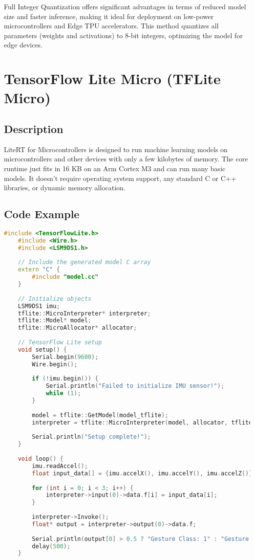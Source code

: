 Full Integer Quantization offers significant advantages in terms of reduced model size and faster inference, making it ideal for deployment on low-power microcontrollers and Edge TPU accelerators. This method quantizes all parameters (weights and activations) to 8-bit integers, optimizing the model for edge devices.\cite{tensorflowlite:2024}

\section{TensorFlow Lite Micro (TFLite Micro)}
\subsection{Description}
LiteRT for Microcontrollers is designed to run machine learning models on microcontrollers and other devices with only a few kilobytes of memory. The core runtime just fits in 16 KB on an Arm Cortex M3 and can run many basic models. It doesn't require operating system support, any standard C or C++ libraries, or dynamic memory allocation.\cite{Tensorflowlite:2024}

\subsection{Code Example}
\begin{lstlisting}[language=C++, caption={Integrating TensorFlow Lite with LSM9DS1 Sensor for Gesture Detection}, label={code:tflite-imu-setup}, style=bashstyle]
	#include <TensorFlowLite.h>
	#include <Wire.h>
	#include <LSM9DS1.h>
	
	// Include the generated model C array
	extern "C" {
		#include "model.cc"
	}
	
	// Initialize objects
	LSM9DS1 imu;
	tflite::MicroInterpreter* interpreter;
	tflite::Model* model;
	tflite::MicroAllocator* allocator;
	
	// TensorFlow Lite setup
	void setup() {
		Serial.begin(9600);
		Wire.begin();
		
		if (!imu.begin()) {
			Serial.println("Failed to initialize IMU sensor!");
			while (1);
		}
		
		model = tflite::GetModel(model_tflite);
		interpreter = tflite::MicroInterpreter(model, allocator, tflite::kTensorArenaSize);
		
		Serial.println("Setup complete!");
	}
	
	void loop() {
		imu.readAccel();
		float input_data[] = {imu.accelX(), imu.accelY(), imu.accelZ()};
		
		for (int i = 0; i < 3; i++) {
			interpreter->input(0)->data.f[i] = input_data[i];
		}
		
		interpreter->Invoke();
		float* output = interpreter->output(0)->data.f;
		
		Serial.println(output[0] > 0.5 ? "Gesture Class: 1" : "Gesture Class: 0");
		delay(500);
	}
\end{lstlisting}


